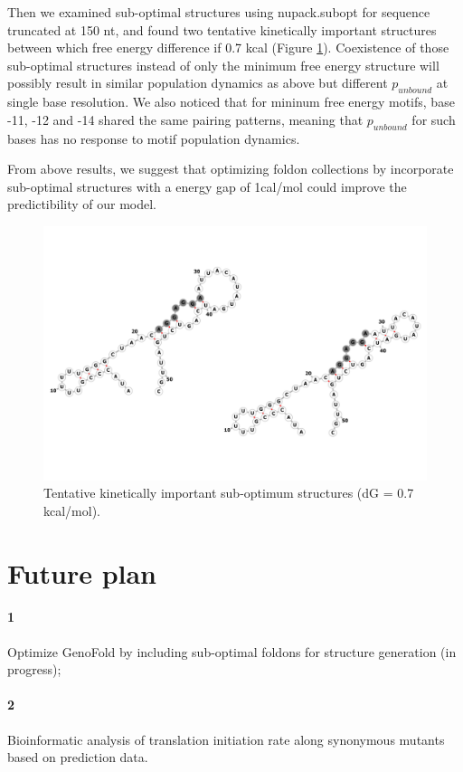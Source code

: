 \documentclass[11pt, a4paper]{article}
\begin{document}
Then we examined sub-optimal structures using nupack.subopt for sequence truncated at 150 nt, and found two tentative kinetically important structures between which free energy difference if 0.7 kcal (Figure \ref{fig:excp}). Coexistence of those sub-optimal structures instead of only the minimum free energy structure will possibly result in similar population dynamics as above but different $p_{unbound}$ at single base resolution. We also noticed that for mininum free energy motifs, base -11, -12 and -14 shared the same pairing patterns, meaning that $p_{unbound}$ for such bases has no response to motif population dynamics.

From above results, we suggest that optimizing foldon collections by incorporate sub-optimal structures with a energy gap of 1cal/mol could improve the predictibility of our model.

\begin{figure}
\centering
\includegraphics[width=\linewidth]{folding_example_grey_compare.png}
\caption{Tentative kinetically important sub-optimum structures (dG = 0.7 kcal/mol).}
\label{fig:excp}
\end{figure}

\section{Future plan}
\paragraph{1} Optimize GenoFold by including sub-optimal foldons for structure generation (in progress);
\paragraph{2} Bioinformatic analysis of translation initiation rate along synonymous mutants based on prediction data.


\small


\end{document}
